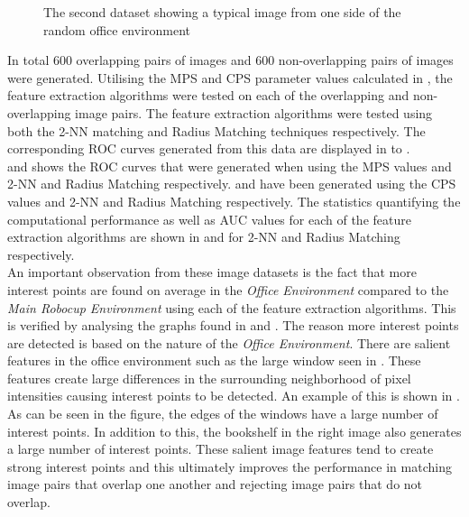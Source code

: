 \documentclass[11pt]{report}
\begin{document}
\begin{figure}[h!]
\begin{minipage}[b]{0.5\linewidth}
\caption{The second dataset showing a typical image from one side of the random office environment}
\label{fig:dataset6}
\end{minipage}
\end{figure}

In total $600$ overlapping pairs of images and $600$ non-overlapping pairs of images were generated. Utilising the MPS and CPS parameter values calculated in , the feature extraction algorithms were tested on each of the overlapping and non-overlapping image pairs. The feature extraction algorithms were tested using both the 2-NN matching and Radius Matching techniques respectively. The corresponding ROC curves generated from this data are displayed in  to . \\

 and  shows the ROC curves that were generated when using the MPS values and 2-NN and Radius Matching respectively.  and  have been generated using the CPS values and 2-NN and Radius Matching respectively. The statistics quantifying the computational performance as well as AUC values for each of the feature extraction algorithms are shown in  and  for 2-NN and Radius Matching respectively. \\

An important observation from these image datasets is the fact that more interest points are found on average in the \textit{Office Environment} compared to the \textit{Main Robocup Environment} using each of the feature extraction algorithms. This is verified by analysing the graphs found in  and . The reason more interest points are detected is based on the nature of the \textit{Office Environment}. There are salient features in the office environment such as the large window seen in . These features create large differences in the surrounding neighborhood of pixel intensities causing interest points to be detected. An example of this is shown in . As can be seen in the figure, the edges of the windows have a large number of interest points. In addition to this, the bookshelf  in the right image also generates a large number of interest points. These salient image features tend to create strong interest points and this ultimately improves the performance in matching image pairs that overlap one another and rejecting image pairs that do not overlap. \\
\end{document}
